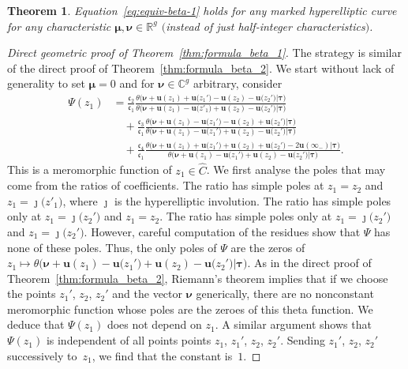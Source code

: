 \documentclass[10pt,a4paper]{amsart}
\numberwithin{equation}{section}
\newtheorem{Theorem}{Theorem}[section]
\begin{document}
\begin{Theorem}
Equation~\eqref{eq:equiv-beta-1} holds for any marked hyperelliptic curve for any characteristic $\bm{\mu},\bm{\nu} \in \mathbb{R}^g$ $($instead of just half-integer characteristics$)$.
\end{Theorem}
\begin{proof}[Direct geometric proof of Theorem~\ref{thm:formula_beta_1}]
 The strategy is similar of the direct proof of Theorem~\ref{thm:formula_beta_2}. We start without lack of generality to set $\bm{\mu} = 0$ and for $\bm{\nu} \in \mathbb{C}^g$ arbitrary, consider
 \begin{align*}
	 \Psi(z_1)
	 &= \frac{\mathfrak{c}_{2}}{\mathfrak{c}_{1}}\frac{\theta\bigl(\bm{\nu} + \bm{u}(z_1) + \bm{u}\bigl(z_1'\bigr) - \bm{u}(z_2) - \bm{u}\bigl(z_2'\bigr)\big|\bm{\tau}\bigr)
		}{\theta\bigl(\bm{\nu} + \bm{u}(z_1) - \bm{u}\bigl(z'_1\bigr) + \bm{u}(z_2) - \bm{u}\bigl(z_2'\bigr)\big|\bm{\tau}\bigr)}\\
	 & \quad +\frac{\mathfrak{c}_{3}}{\mathfrak{c}_{1}}\frac{\theta\bigl(\bm{\nu} + \bm{u}(z_1) - \bm{u}\bigl(z_1'\bigr) - \bm{u}(z_2) + \bm{u}\bigl(z_2'\bigr)\big|\bm{\tau}\bigr)
		}{\theta\bigl(\bm{\nu} + \bm{u}(z_1) - \bm{u}\bigl(z_1'\bigr) + \bm{u}(z_2) - \bm{u}\bigl(z_2'\bigr)\big|\bm{\tau}\bigr)}\\
	 & \quad +\frac{\mathfrak{c}_{4}}{\mathfrak{c}_{1}}\frac{\theta\bigl(\bm{\nu} + \bm{u}(z_1) + \bm{u}\bigl(z_1'\bigr)+\bm{u}(z_2)+\bm{u}\bigl(z_2'\bigr) - 2\bm{u}(\infty_-)\big|\bm{\tau}\bigr)}{\theta\bigl(\bm{\nu} + \bm{u}(z_1) - \bm{u}\bigl(z_1'\bigr) + \bm{u}(z_2) - \bm{u}\bigl(z_2'\bigr)\big|\bm{\tau}\bigr)}.
 \end{align*}
This is a meromorphic function of $z_1 \in \widehat{C}$. We first analyse the poles that may come from the ratios of coefficients. The ratio
  has simple poles at
 $z_1 = z_2$ and $z_1 = \jmath\bigl(z'_1\bigr)$, where $\jmath$ is the hyperelliptic involution. The
 ratio  has simple poles only at
 $z_1 = \jmath\bigl(z_2'\bigr)$ and $z_1 = z_2$. The ratio
  has simple poles only at
 $z_1 = \jmath\bigl(z_2'\bigr)$ and $z_1 = \jmath\bigl(z_2'\bigr)$. However, careful computation of the
 residues show that $\Psi$ has none of these poles. Thus, the only poles of $\Psi$ are the zeros of $z_1 \mapsto \theta\bigl(\bm{\nu} + \bm{u}(z_1) - \bm{u}\bigl(z_1'\bigr) + \bm{u}(z_2) - \bm{u}\bigl(z_2'\bigr)\big|\bm{\tau}\bigr)$. As in the direct proof of Theorem~\ref{thm:formula_beta_2}, Riemann's theorem implies that if we choose the points $z_1'$, $z_2$, $z_2'$ and the vector $\bm{\nu}$ generically, there are no nonconstant meromorphic function whose poles are the zeroes of this theta function. We deduce that $\Psi(z_1)$ does not depend on $z_1$. A similar argument shows that $\Psi(z_1)$ is independent of all points
 points $z_1$, $z_1'$, $z_2$, $z_2'$. Sending $z_1'$, $z_2$, $z_2'$ successively to~$z_1$, we find that the constant is~$1$.
\end{proof}
\end{document}
